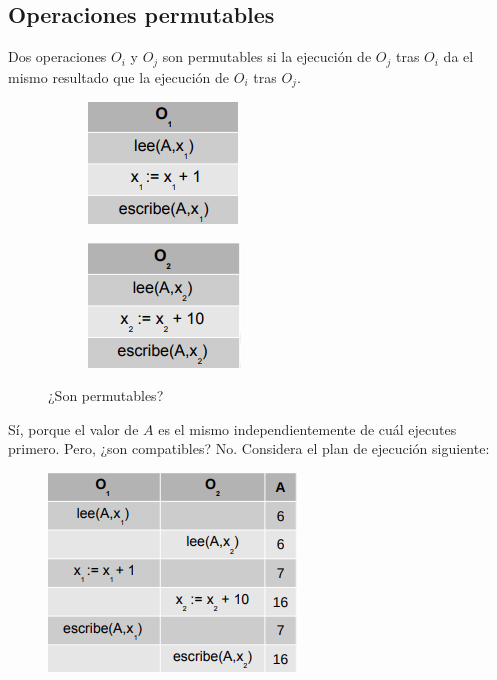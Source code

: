 \subsection{Operaciones permutables}

Dos operaciones $O_i$ y $O_j$ son permutables si la ejecución de $O_j$ tras $O_i$ da el mismo resultado que la ejecución de $O_i$ tras $O_j$.

\begin{figure}[H]
\centering
\begin{subfigure}{.5\textwidth}
  \centering
  \includegraphics[width=.4\linewidth]{img/34.png}
\end{subfigure}%
\begin{subfigure}{.5\textwidth}
  \centering
  \includegraphics[width=.4\linewidth]{img/35.png}
\end{subfigure}
\caption{¿Son permutables?}
\end{figure}

Sí, porque el valor de $A$ es el mismo independientemente de cuál ejecutes primero. Pero, ¿son compatibles? No. Considera el plan de ejecución siguiente:

\begin{figure}[H]
  \center
  \includegraphics[scale=0.6]{img/36.png}
\end{figure}


